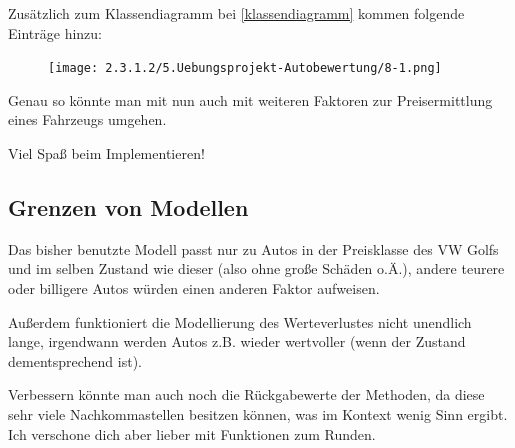\documentclass{scrartcl}   %
\begin{document}
Zusätzlich zum Klassendiagramm bei \ref{klassendiagramm} kommen folgende Einträge hinzu:

\begin{figure}[ht]
	\centering
	\texttt{[image: 2.3.1.2/5.Uebungsprojekt-Autobewertung/8-1.png]}
\end{figure}

Genau so könnte man mit nun auch mit weiteren Faktoren zur Preisermittlung eines Fahrzeugs umgehen.

Viel Spaß beim Implementieren!

\subsection{Grenzen von Modellen}

Das bisher benutzte Modell passt nur zu Autos in der Preisklasse des VW Golfs und im selben Zustand wie dieser (also ohne große Schäden o.Ä.), andere teurere oder billigere Autos würden einen anderen Faktor aufweisen.

Außerdem funktioniert die Modellierung des Werteverlustes nicht unendlich lange, irgendwann werden Autos z.B. wieder wertvoller (wenn der Zustand dementsprechend ist).

Verbessern könnte man auch noch die Rückgabewerte der Methoden, da diese sehr viele Nachkommastellen besitzen können, was im Kontext wenig Sinn ergibt. Ich verschone dich aber lieber mit Funktionen zum Runden.
\end{document}
